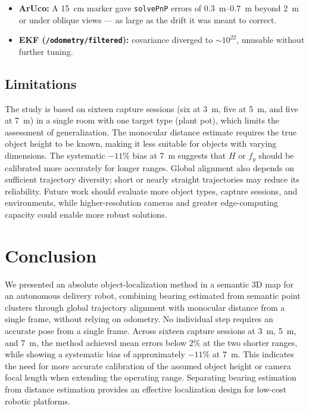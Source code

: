 \documentclass[conference]{IEEEtran}
\begin{document}
\begin{itemize}[leftmargin=*,itemsep=0.1em,topsep=0.2em,parsep=0pt]
\item \textbf{ArUco:} A \SI{15}{\centi\meter} marker gave \texttt{solvePnP} errors of \SIrange{0.3}{0.7}{\meter} beyond \SI{2}{\meter} or under oblique views --- as large as the drift it was meant to correct.
\item \textbf{EKF (\texttt{/odometry/filtered}):} covariance diverged to $\sim 10^{22}$, unusable without further tuning.
\end{itemize}


\subsection{Limitations}
\label{sec:limitations}

The study is based on sixteen capture sessions (six at \SI{3}{\meter}, five at \SI{5}{\meter}, and five at \SI{7}{\meter}) in a single room with one target type (plant pot), which limits the assessment of generalization. The monocular distance estimate requires the true object height to be known, making it less suitable for objects with varying dimensions. The systematic $-11\%$ bias at \SI{7}{\meter} suggests that $H$ or $f_y$ should be calibrated more accurately for longer ranges. Global alignment also depends on sufficient trajectory diversity; short or nearly straight trajectories may reduce its reliability. Future work should evaluate more object types, capture sessions, and environments, while higher-resolution cameras and greater edge-computing capacity could enable more robust solutions.


\section{Conclusion}

We presented an absolute object-localization method in a semantic 3D map for an autonomous delivery robot, combining bearing estimated from semantic point clusters through global trajectory alignment with monocular distance from a single frame, without relying on odometry. No individual step requires an accurate pose from a single frame. Across sixteen capture sessions at \SI{3}{\meter}, \SI{5}{\meter}, and \SI{7}{\meter}, the method achieved mean errors below $2\%$ at the two shorter ranges, while showing a systematic bias of approximately $-11\%$ at \SI{7}{\meter}. This indicates the need for more accurate calibration of the assumed object height or camera focal length when extending the operating range. Separating bearing estimation from distance estimation provides an effective localization design for low-cost robotic platforms.




\end{document}
